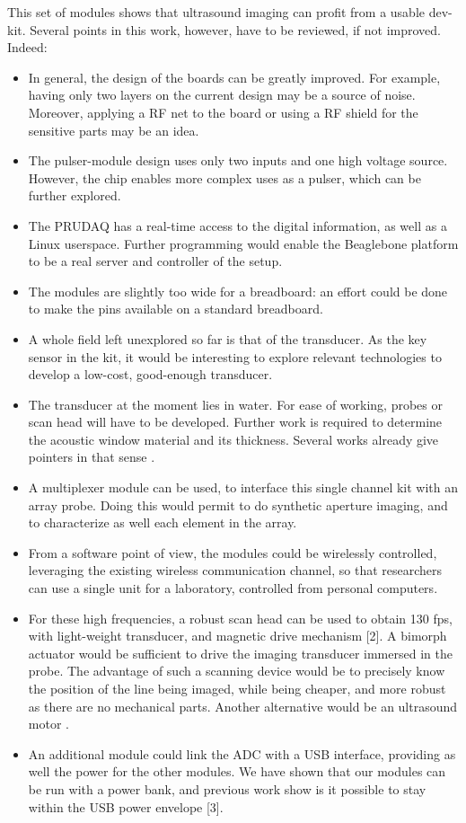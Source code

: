 \documentclass[letterpaper, 10 pt, conference]{ieeeconf} %
\begin{document}
This set of modules shows that ultrasound imaging can profit from a usable dev-kit. Several points in this work, however, have to be reviewed, if not improved. Indeed:

\begin{itemize}
\item In general, the design of the boards can be greatly improved. For example, having only two layers on the current design may be a source of noise. Moreover, applying a RF net to the board or using a RF shield for the sensitive parts may be an idea.
\item The pulser-module design uses only two inputs and one high voltage source. However, the chip enables more complex uses as a pulser, which can be further explored.
\item The PRUDAQ has a real-time access to the digital information, as well as a Linux userspace. Further programming would enable the Beaglebone platform to be a real server and controller of the setup.
\item The modules are slightly too wide for a breadboard: an effort could be done to make the pins available on a standard breadboard.
\item A whole field left unexplored so far is that of the transducer. As the key sensor in the kit, it would be interesting to explore relevant technologies to develop a low-cost, good-enough transducer.
\item The transducer at the moment lies in water. For ease of working, probes or scan head will have to be developed. Further work is required to determine the acoustic window material and its thickness. Several works already give pointers in that sense \cite{c1}.
\item A multiplexer module can be used, to interface this single channel kit with an array probe. Doing this would permit to do synthetic aperture imaging, and to characterize as well each element in the array.
\item From a software point of view, the modules could be wirelessly controlled, leveraging the existing wireless communication channel, so that researchers can use a single unit for a laboratory, controlled from personal computers.
\item For these high frequencies, a robust scan head can be used to obtain 130 fps, with light-weight transducer, and magnetic drive mechanism [2]. A bimorph actuator would be sufficient to drive the imaging transducer \cite{c4,c5} immersed in the probe. The advantage of such a scanning device would be to precisely know the position of the line being imaged, while being cheaper, and more robust as there are no mechanical parts. Another alternative would be an ultrasound motor \cite{c6}.
\item An additional module could link the ADC with a USB interface, providing as well the power for the other modules. We have shown that our modules can be run with a power bank, and previous work show is it possible to stay within the USB power envelope [3].
\end{itemize}
\end{document}
